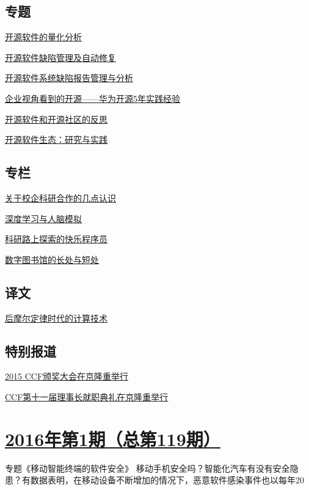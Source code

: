 \documentclass[a4paper]{article}
\begin{document}
\subsection{专题}
\href{http://history.ccf.org.cn/resources/1190201776262/2016/02/17/4.pdf}{开源软件的量化分析}

\href{http://history.ccf.org.cn/resources/1190201776262/2016/02/17/6.pdf}{开源软件缺陷管理及自动修复}

\href{http://history.ccf.org.cn/resources/1190201776262/2016/02/17/5.pdf}{开源软件系统缺陷报告管理与分析}

\href{http://history.ccf.org.cn/resources/1190201776262/2016/02/16/7.pdf}{企业视角看到的开源——华为开源5年实践经验}

\href{http://history.ccf.org.cn/resources/1190201776262/2016/02/17/8.pdf}{开源软件和开源社区的反思}

\href{http://history.ccf.org.cn/resources/1190201776262/2016/02/16/3.pdf}{开源软件生态：研究与实践}

\subsection{专栏}
\href{http://history.ccf.org.cn/resources/1190201776262/2016/02/16/9.pdf}{关于校企科研合作的几点认识}

\href{http://history.ccf.org.cn/resources/1190201776262/2016/02/16/10.pdf}{深度学习与人脑模拟}

\href{http://history.ccf.org.cn/resources/1190201776262/2016/02/16/11.pdf}{科研路上探索的快乐程序员}

\href{http://history.ccf.org.cn/resources/1190201776262/2016/02/16/12.pdf}{数字图书馆的长处与短处}

\subsection{译文}
\href{http://history.ccf.org.cn/resources/1190201776262/2016/02/17/17.pdf}{后摩尔定律时代的计算技术}

\subsection{特别报道}
\href{http://history.ccf.org.cn/resources/1190201776262/2016/02/16/2.pdf}{2015 CCF颁奖大会在京隆重举行}

\href{http://history.ccf.org.cn/resources/1190201776262/2016/02/16/1.pdf}{CCF第十一届理事长就职典礼在京隆重举行}


\section{\href{http://history.ccf.org.cn/sites/ccf/jsjtbbd.jsp?contentId=2903940692049}{\textbf{2016年第1期（总第119期）}}}
专题《移动智能终端的软件安全》
移动手机安全吗？智能化汽车有没有安全隐患？有数据表明，在移动设备不断增加的情况下，恶意软件感染事件也以每年20%
\end{document}
